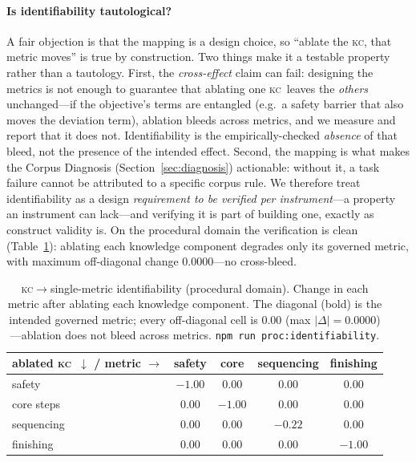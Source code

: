 \documentclass{article}
\newcommand{\kc}{\textsc{kc}}
\begin{document}
\paragraph{Is identifiability tautological?} A fair objection is that the mapping is a
design choice, so ``ablate the \kc, that metric moves'' is true by construction. Two things
make it a testable property rather than a tautology. First, the \emph{cross-effect} claim
can fail: designing the metrics is not enough to guarantee that ablating one \kc\ leaves the
\emph{others} unchanged---if the objective's terms are entangled (e.g.\ a safety barrier
that also moves the deviation term), ablation bleeds across metrics, and we measure and
report that it does not. Identifiability is the empirically-checked \emph{absence} of that
bleed, not the presence of the intended effect. Second, the mapping is what makes the
Corpus Diagnosis (Section~\ref{sec:diagnosis}) actionable: without it, a task failure cannot be
attributed to a specific corpus rule. We therefore treat identifiability as a design
\emph{requirement to be verified per instrument}---a property an instrument can lack---and
verifying it is part of building one, exactly as construct validity is. On the procedural
domain the verification is clean (Table~\ref{tab:ident}): ablating each knowledge component
degrades only its governed metric, with maximum off-diagonal change $0.0000$---no cross-bleed.

\begin{table}[t]
\centering
\small
\begin{tabular}{@{}lcccc@{}}
\toprule
ablated \kc\ $\downarrow$ / metric $\rightarrow$ & safety & core & sequencing & finishing \\
\midrule
safety      & $\mathbf{-1.00}$ & $0.00$ & $0.00$ & $0.00$ \\
core steps  & $0.00$ & $\mathbf{-1.00}$ & $0.00$ & $0.00$ \\
sequencing  & $0.00$ & $0.00$ & $\mathbf{-0.22}$ & $0.00$ \\
finishing   & $0.00$ & $0.00$ & $0.00$ & $\mathbf{-1.00}$ \\
\bottomrule
\end{tabular}
\caption{\kc$\to$single-metric identifiability (procedural domain). Change in each metric
after ablating each knowledge component. The diagonal (bold) is the intended governed
metric; every off-diagonal cell is $0.00$ (max $|\Delta|=0.0000$)---ablation does not bleed
across metrics. \texttt{npm run proc:identifiability}.}
\label{tab:ident}
\end{table}
\end{document}
